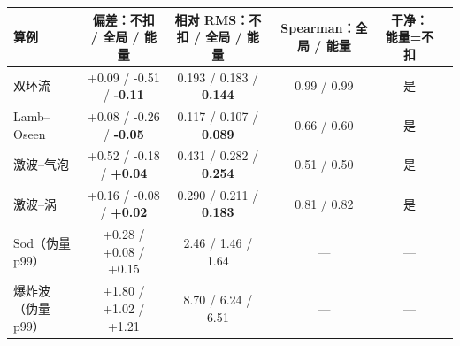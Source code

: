 \begin{tabular}{lccccc}\toprule 算例 & 偏差：不扣 / 全局 / \textbf{能量} & 相对 RMS：不扣 / 全局 / \textbf{能量} & Spearman：全局 / \textbf{能量} & 干净：能量=不扣 \\\midrule
双环流 & +0.09 / -0.51 / \textbf{-0.11} & 0.193 / 0.183 / \textbf{0.144} & 0.99 / 0.99 & 是 \\
Lamb–Oseen & +0.08 / -0.26 / \textbf{-0.05} & 0.117 / 0.107 / \textbf{0.089} & 0.66 / 0.60 & 是 \\
激波–气泡 & +0.52 / -0.18 / \textbf{+0.04} & 0.431 / 0.282 / \textbf{0.254} & 0.51 / 0.50 & 是 \\
激波–涡 & +0.16 / -0.08 / \textbf{+0.02} & 0.290 / 0.211 / \textbf{0.183} & 0.81 / 0.82 & 是 \\
Sod（伪量 p99） & +0.28 / +0.08 / +0.15 & 2.46 / 1.46 / 1.64 & — & — \\
爆炸波（伪量 p99） & +1.80 / +1.02 / +1.21 & 8.70 / 6.24 / 6.51 & — & — \\
\bottomrule\end{tabular}
